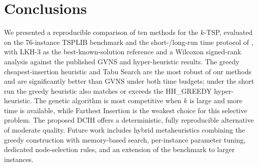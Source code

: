

\section{Conclusions}\label{sec:conclusions}

We presented a reproducible comparison of ten methods for the $k$-TSP, evaluated on
the 76-instance TSPLIB benchmark and the short-/long-run time protocol of
\citet{pandiri2020}, with LKH-3 as the best-known-solution reference and a
Wilcoxon signed-rank analysis against the published GVNS and hyper-heuristic
results. The greedy cheapest-insertion heuristic and Tabu Search are the most
robust of our methods and are significantly better than GVNS under both time
budgets; under the short run the greedy heuristic also matches or exceeds the
HH\_GREEDY hyper-heuristic. The genetic algorithm is most competitive when $k$ is
large and more time is available, while Farthest Insertion is the weakest choice
for this selective problem. The proposed DCIH offers a deterministic,
fully reproducible alternative of moderate quality. Future work includes hybrid
metaheuristics combining the greedy construction with memory-based search,
per-instance parameter tuning, dedicated node-selection rules, and an extension of
the benchmark to larger instances.
